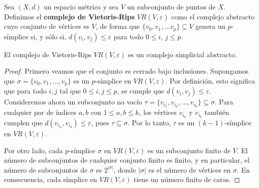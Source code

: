 
\begin{definicion}
	Sea \((X,d)\) un espacio métrico y sea \(V\) un subconjunto de puntos de \(X\). Definimos el \textbf{complejo de Vietoris-Rips} \(VR(V,\varepsilon)\) como el complejo abstracto cuyo conjunto de vértices es \(V\), de forma que \(\{v_0, v_1, \dots v_p\} \subseteq V\) genera un \(p\)-símplice si, y sólo si, \(d(v_i,v_j) \leq \varepsilon\) para todo \(0 \leq i\), \(j \leq p\).
\end{definicion}

\begin{proposicion}
	El complejo de Vietoris-Rips \(VR(V,\varepsilon)\) es un complejo simplicial abstracto.
\end{proposicion}

\begin{proof}
	Primero veamos que el conjunto es cerrado bajo inclusiones. Supongamos que $\sigma = \{v_0, v_1, \dots, v_p\}$ es un $p$-símplice en $VR(V, \varepsilon)$. Por definición, esto significa que para todo $i, j$ tal que $0 \leq i, j \leq p$, se cumple que $d(v_i, v_j) \leq \varepsilon$. Consideremos ahora un subconjunto no vacío $\tau = \{v_{i_1}, v_{i_2}, \dots, v_{i_k}\} \subseteq \sigma$. Para cualquier par de índices $a, b$ con $1 \leq a, b \leq k$, los vértices $v_{i_a}$ y $v_{i_b}$ también cumplen que $d(v_{i_a}, v_{i_b}) \leq \varepsilon$, pues $\tau \subseteq \sigma$. Por lo tanto, $\tau$ es un $(k-1)$-símplice en $VR(V, \varepsilon)$.
	
	Por otro lado, cada $p$-símplice $\sigma$ en $VR(V, \varepsilon)$ es un subconjunto finito de $V$. El número de subconjuntos de cualquier conjunto finito es finito, y en particular, el número de subconjuntos de $\sigma$ es $2^{|\sigma|}$, donde $|\sigma|$ es el número de vértices en $\sigma$. En consecuencia, cada símplice en $VR(V, \varepsilon)$ tiene un número finito de caras.
\end{proof}

